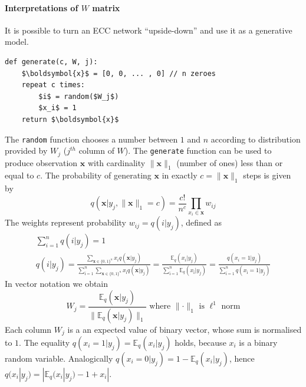 \documentclass[12pt]{article}
\begin{document}
\paragraph{Interpretations of $W$ matrix}\label{par:generate_function}  It is possible to turn an ECC network ``upside-down'' and use it as a generative model.
\begin{lstlisting}
def generate(c, W, j):
    $\boldsymbol{x}$ = [0, 0, ... , 0] // n zeroes
    repeat c times:
        $i$ = random($W_j$)
        $x_i$ = 1
    return $\boldsymbol{x}$
\end{lstlisting}
The \texttt{random} function chooses a number between $1$ and $n$ according to distribution provided by $W_j$ ($j^{th}$ column of $W$). The \texttt{generate} function can be used to produce observation $\boldsymbol{x}$ with cardinality $\lVert\boldsymbol{x} \rVert_1$ (number of ones) less than or equal to $c$.  The probability of generating $\boldsymbol{x}$ in exactly $c=\lVert\boldsymbol{x} \rVert_1$ steps is given by 
 \[
 q(\boldsymbol{x}|y_j, \lVert\boldsymbol{x} \rVert_1 = c) = \frac{c!}{n^c}\prod_{x_i\in\boldsymbol{x}} w_{ij}
 \]
 The weights represent probability $w_{ij} = q(i| y_j)$, defined as
\begin{gather*}
\sum_{i=1}^{n} q(i | y_j) = 1 \\
q(i | y_j) =
\frac{\sum_{\boldsymbol{x}\in\{0,1\}^n}x_i  q(\boldsymbol{x}|y_j) }{\sum_{ï=1}^{n} \sum_{\boldsymbol{x}\in\{0,1\}^n}    x_{ï}  q(\boldsymbol{x}|y_j) } = \frac{\mathbb{E}_q(x_i|y_j)}{\sum_{ï=1}^{n} \mathbb{E}_q(x_{ï}|y_j)} =  \frac{q(x_i{=}1|y_j)}{\sum_{ï=1}^{n} q(x_{ï}{=}1|y_j)} 
\end{gather*}
In vector notation we obtain
\[
W_j = \frac{\mathbb{E}_q(\boldsymbol{x}|y_j)}{\lVert \mathbb{E}_q(\boldsymbol{x}|y_j) \rVert _1}\text{ where }\lVert \cdot \rVert _1\text{ is }\ell^1\text{ norm}
\]
Each column $W_j$ is a an expected value of binary vector, whose sum is normalised to $1$. The equality  $q(x_i{=}1|y_j)=\mathbb{E}_q(x_i|y_j)$ holds, because $x_i$ is a binary random variable. Analogically $q(x_i{=}0|y_j)=1-\mathbb{E}_q(x_i|y_j)$, hence $q(x_i|y_j)=|\mathbb{E}_q(x_i|y_j)-1+x_i|$.
\end{document}
